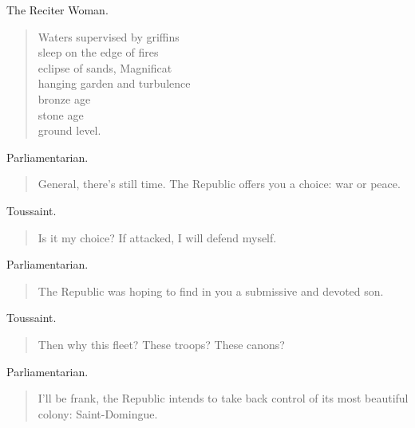 \documentclass[letterpaper,article,12pt,oneside,notitlepage]{memoir}
\begin{document}
\begin{center}The Reciter Woman.\end{center}

\begin{verse}
Waters supervised by griffins \\
sleep on the edge of fires \\
eclipse of sands, Magnificat \\
hanging garden and turbulence \\
bronze age \\
stone age \\
ground level. \\
\end{verse}

\begin{center}Parliamentarian.\end{center}

\begin{verse}
General, there's still time. The Republic offers you a choice: war or peace. \\
\end{verse}

\begin{center}Toussaint.\end{center}

\begin{verse}
Is it my choice? If attacked, I will defend myself. \\
\end{verse}

\begin{center}Parliamentarian.\end{center}

\begin{verse}
The Republic was hoping to find in you a submissive and devoted son. \\
\end{verse}

\begin{center}Toussaint.\end{center}

\begin{verse}
Then why this fleet? These troops? These canons? \\
\end{verse}

\begin{center}Parliamentarian.\end{center}

\begin{verse}
I'll be frank, the Republic intends to take back control of its most beautiful colony: Saint-Domingue. \\
\end{verse}
\end{document}
